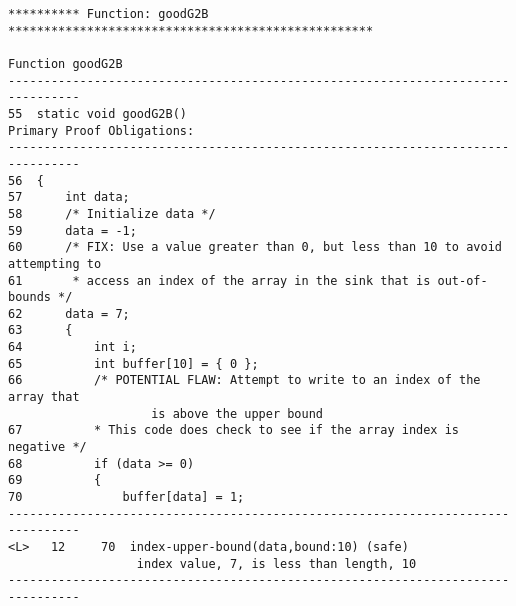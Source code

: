 \documentclass[11pt]{article}
\begin{document}
\begin{small}
\begin{verbatim}
********** Function: goodG2B ***************************************************

Function goodG2B
--------------------------------------------------------------------------------
55  static void goodG2B()
Primary Proof Obligations:
--------------------------------------------------------------------------------
56  {
57      int data;
58      /* Initialize data */
59      data = -1;
60      /* FIX: Use a value greater than 0, but less than 10 to avoid attempting to
61       * access an index of the array in the sink that is out-of-bounds */
62      data = 7;
63      {
64          int i;
65          int buffer[10] = { 0 };
66          /* POTENTIAL FLAW: Attempt to write to an index of the array that 
                    is above the upper bound
67          * This code does check to see if the array index is negative */
68          if (data >= 0)
69          {
70              buffer[data] = 1;
--------------------------------------------------------------------------------
<L>   12     70  index-upper-bound(data,bound:10) (safe)
                  index value, 7, is less than length, 10
--------------------------------------------------------------------------------
\end{verbatim}
\end{small}
\end{document}

